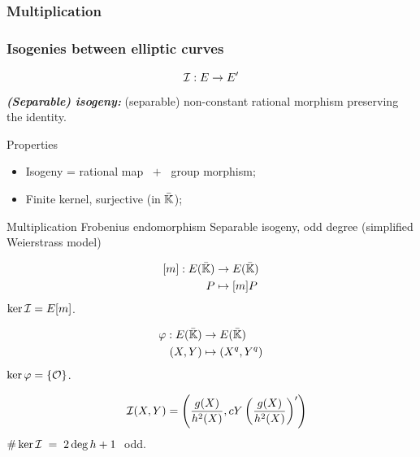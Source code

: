\documentclass[10pt,usepdftitle=false]{beamer}
\begin{document}
\begin{frame}
\end{frame}


\begin{frame}
  \frametitle{Multiplication}
  
\end{frame}


\begin{frame}
  \frametitle{Isogenies between elliptic curves}
  
  \vspace{-2mm}

  {\large \[\mathcal{I}:E\to E'\]} 
  \emph{\textbf{(Separable) isogeny:}} (separable)
  non-constant rational morphism preserving the identity.
  
  \begin{block}{Properties}
    \begin{itemize}
    \item Isogeny = rational map $\;+\;$ group morphism;
    \item Finite kernel, surjective (in $\bar{\mathbb{K}}$);
    \end{itemize}
  \end{block}

  \vspace{-1mm}

  \begin{block}{
	\begin{overprint}
	 Multiplication	
	\onslide<2> Frobenius endomorphism
	\onslide<3> Separable isogeny, odd degree (simplified Weierstrass model)
	\end{overprint}
      }
    \begin{overprint}
      \[\begin{aligned}
	{}[m] : E(\bar{\mathbb{K}}) &\rightarrow E(\bar{\mathbb{K}})\\
	                   P &\mapsto [m]P
      \end{aligned}\]
      $\ker\mathcal{I} = E[m]$.

      \[\begin{aligned}
	\varphi : E(\bar{\mathbb{K}}) &\rightarrow E(\bar{\mathbb{K}})\\
	               (X,Y) &\mapsto (X^q,Y^q)
      \end{aligned}\]
      $\ker\varphi = \{\mathcal{O}\}$.

      \[\quad\mathcal{I}(X,Y) = \left(\frac{g(X)}{h^2(X)},
      cY\left(\frac{g(X)}{h^2(X)}\right)'\right)\]
      $\# \ker\mathcal{I} \;=\; 2\deg h + 1\;$ odd.
    \end{overprint}
  \end{block}  
\end{frame}
\end{document}
